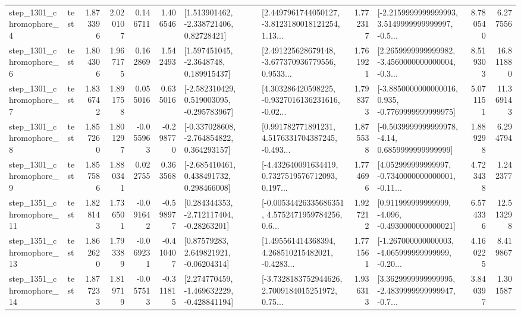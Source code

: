 \begin{tabular}{llrrrrllrlrr}
  step\_1301\_chromophore\_4 &      test &      1.873396 &    2.020107 &      0.146711 &  1.406546 &     [1.513901462, -2.338721406, 0.82728421] &  [2.4497961744050127, -3.8123180018121254, 1.13... &       1.772317 &  [-2.2159999999999993, 3.5149999999999997, -0.5... &            8.780540 &          6.277556 \\
  step\_1301\_chromophore\_6 &      test &      1.804306 &    1.967175 &      0.162869 &  1.542493 &      [1.597451045, -2.3648748, 0.189915437] &  [2.491225628679148, -3.677370936779556, 0.9533... &       1.761921 &  [2.2659999999999982, -3.4560000000000004, -0.3... &            8.519303 &         16.811880 \\
  step\_1301\_chromophore\_7 &      test &      1.836742 &    1.891758 &      0.055016 &  0.635016 &   [-2.582310429, 0.519003095, -0.295783967] &  [4.303286420598225, -0.9327016136231616, -0.02... &       1.798373 &  [-3.8850000000000016, 0.935, -0.7769999999999975] &            5.071151 &         11.369143 \\
  step\_1301\_chromophore\_8 &      test &      1.857260 &    1.801297 &     -0.055963 & -0.298770 &   [-0.337028608, -2.764854822, 0.364293157] &  [0.991782771891231, 4.5176331704387245, -0.493... &       1.875538 &   [-0.5039999999999978, -4.14, 0.6859999999999999] &            1.889298 &          6.294794 \\
  step\_1301\_chromophore\_9 &      test &      1.857586 &    1.880341 &      0.022755 &  0.363568 &    [-2.685410461, 0.438491732, 0.298466008] &  [-4.432640091634419, 0.7327519576712093, 0.197... &       1.774696 &  [4.052999999999997, -0.7340000000000001, -0.11... &            4.723438 &          1.242377 \\
 step\_1351\_chromophore\_11 &      test &      1.828143 &    1.736501 &     -0.091642 & -0.598977 &    [0.284344353, -2.712117404, -0.28263201] &  [-0.00534426335686351, 4.5752471959784256, 0.6... &       1.927212 &   [0.911999999999999, -4.096, -0.4930000000000021] &            6.574336 &         12.513298 \\
 step\_1351\_chromophore\_13 &      test &      1.862620 &    1.793389 &     -0.069231 & -0.410407 &      [0.87579283, 2.649821921, -0.06204314] &  [1.495561414368394, 4.268510215482021, -0.4283... &       1.771561 &  [-1.267000000000003, -4.065999999999999, -0.20... &            4.160225 &          8.419867 \\
 step\_1351\_chromophore\_14 &      test &      1.877233 &    1.819719 &     -0.057513 & -0.311815 &   [2.274770459, -1.469632229, -0.428841194] &  [-3.7328183752944626, 2.7009184015251972, 0.75... &       1.936313 &  [3.3629999999999995, -2.4839999999999947, -0.7... &            3.840397 &          1.301587 \\

\end{tabular}
